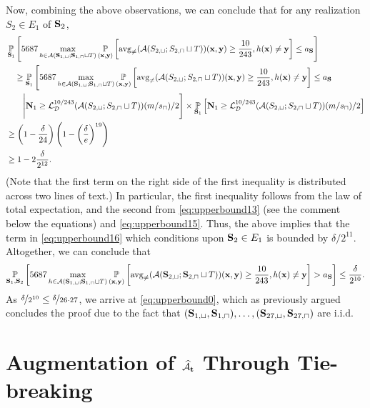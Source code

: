 \begin{proofof}{}
Now, combining the above observations, we can conclude that for any realization $S_{2} \in E_{1}$ of $\mathbf{S}_{2}$,
\begingroup
\allowdisplaybreaks
\begin{align*}
&\operatorname*{\mathbb{P}}_{\mathbf{S}_{1}}\Bigg[5687\max_{h\in \mathcal{A}(\mathbf{S}_{1,\sqcup};\mathbf{S}_{1,\sqcap}\sqcup T)}\operatorname*{\mathbb{P}}_{(\mathbf{x},\mathbf{y})}\left[\operatorname{\mathrm{avg}_{\not=}}(\mathcal{A}(S_{2,\sqcup};S_{2,\sqcap}\sqcup T))(\mathbf{x},\mathbf{y})\geq \frac{10}{243},h(\mathbf{x})\not=\mathbf{y}\right] \leq a_{\mathbf{S}} \Bigg]
\\
& \quad \geq\operatorname*{\mathbb{P}}_{\mathbf{S}_{1}}\Bigg[5687\max_{h\in \mathcal{A}(\mathbf{S}_{1,\sqcup};\mathbf{S}_{1,\sqcap}\sqcup T)}\operatorname*{\mathbb{P}}_{(\mathbf{x},\mathbf{y})}\left[\operatorname{\mathrm{avg}_{\not=}}(\mathcal{A}(S_{2,\sqcup};S_{2,\sqcap}\sqcup T))(\mathbf{x},\mathbf{y})\geq \frac{10}{243},h(\mathbf{x})\not=\mathbf{y}\right] \leq
a_{\mathbf{S}} \\ 
&\qquad \Bigg| \mathbf{N}_1\geq \operatorname{\mathcal{L}}_{\mathcal{D}}^{10/243}(\mathcal{A}(S_{2,\sqcup};S_{2,\sqcap}\sqcup T))(m/s_{\sqcap})/2 \Bigg]  \times \operatorname*{\mathbb{P}}_{\mathbf{S}_{1}}\left[\mathbf{N}_1\geq \operatorname{\mathcal{L}}_{\mathcal{D}}^{10/243}(\mathcal{A}(S_{2,\sqcup};S_{2,\sqcap}\sqcup T))(m/s_{\sqcap})/2\right] 
\\
&\geq  \left( 1- \frac{\delta}{24} \right) \left( 1- \left(\frac{\delta}{e} \right)^{19} \right) \\ 
&\geq 1- 2\frac{\delta}{2^{12}}.
\end{align*} 
\endgroup
(Note that the first term on the right side of the first inequality is distributed across two lines of text.) In particular, 
 the first inequality follows from the law of total expectation, and the second from \cref{eq:upperbound13} (see the comment below the equations) and \cref{eq:upperbound15}.
Thus, the above implies that the term in \cref{eq:upperbound16} which conditions upon $\mathbf{S}_{2}\in E_{1}$ is bounded by $ \delta/2^{11}$. Altogether, we can conclude that 
\begin{align*}
    \operatorname*{\mathbb{P}}_{\mathbf{S}_{1},\mathbf{S}_{2}}\left[5687\max_{h\in \mathcal{A}(\mathbf{S}_{1,\sqcup};\mathbf{S}_{1,\sqcap}\sqcup T)}\operatorname*{\mathbb{P}}_{(\mathbf{x},\mathbf{y})}\left[\operatorname{\mathrm{avg}_{\not=}}(\mathcal{A}(\mathbf{S}_{2,\sqcup};\mathbf{S}_{2,\sqcap}\sqcup T))(\mathbf{x},\mathbf{y})\geq \frac{10}{243},h(\mathbf{x})\not=\mathbf{y}\right] >a_{\mathbf{S}}\right]
    \leq \frac{\delta}{2^{10}}. 
\end{align*} 
As $ \nicefrac{\delta}{2^{10}} \leq \nicefrac{\delta}{26\cdot 27}$, we arrive at \cref{eq:upperbound0}, which as previously argued concludes the proof due to the fact that $(\mathbf{S}_{1,\sqcup},\mathbf{S}_{1,\sqcap}), \ldots, (\mathbf{S}_{27,\sqcup},\mathbf{S}_{27,\sqcap})$ are i.i.d.\ 
\end{proofof}

\section{Augmentation of $\widehat{\mathcal{A}}_{\mathbf{t}}$ Through Tie-breaking}

